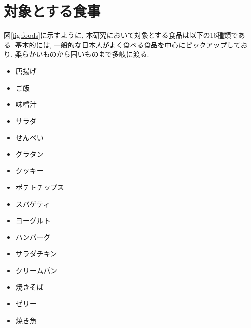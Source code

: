
\section{対象とする食事}

図\ref{fig:foods}に示すように, 本研究において対象とする食品は以下の16種類である. 基本的には, 一般的な日本人がよく食べる食品を中心にピックアップしており, 柔らかいものから固いものまで多岐に渡る.

\begin{itemize}
    \item 唐揚げ
    \item ご飯
    \item 味噌汁
    \item サラダ
    \item せんべい
    \item グラタン
    \item クッキー
    \item ポテトチップス
    \item スパゲティ
    \item ヨーグルト
    \item ハンバーグ
    \item サラダチキン
    \item クリームパン
    \item 焼きそば
    \item ゼリー
    \item 焼き魚
\end{itemize}

